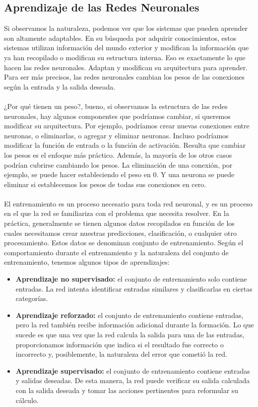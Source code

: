 \documentclass[12pt, a4paper, titlepage]{report}
\begin{document}
				\subsection{Aprendizaje de las Redes Neuronales}
				Si observamos la naturaleza, podemos ver que los sistemas que pueden aprender son altamente adaptables. En su búsqueda por adquirir conocimientos, estos sistemas utilizan información del mundo exterior y modifican la información que ya han recopilado o modifican su estructura interna. Eso es exactamente lo que hacen las redes neuronales. Adaptan y modifican su arquitectura para aprender. Para ser más precisos, las redes neuronales cambian los pesos de las conexiones según la entrada y la salida deseada.\\\\
				¿Por qué tienen un peso?, bueno, si observamos la estructura de las redes neuronales, hay algunos componentes que podríamos cambiar, si queremos modificar su arquitectura. Por ejemplo, podríamos crear nuevas conexiones entre neuronas, o eliminarlas, o agregar y eliminar neuronas. Incluso podríamos modificar la función de entrada o la función de activación. Resulta que cambiar los pesos es el enfoque más práctico. Además, la mayoría de los otros casos podrían cubrirse cambiando los pesos. La eliminación de una conexión, por ejemplo, se puede hacer estableciendo el peso en 0. Y una neurona se puede eliminar si establecemos los pesos de todas sus conexiones en cero.\cite{refAprendizajeRedes}\\\\
				El entrenamiento es un proceso necesario para toda red neuronal, y es un proceso en el que la red se familiariza con el problema que necesita resolver. En la práctica, generalmente se tienen algunos datos recopilados en función de los cuales necesitamos crear nuestras predicciones, clasificación, o cualquier otro procesamiento. Estos datos se denominan conjunto de entrenamiento. Según el comportamiento durante el entrenamiento y la naturaleza del conjunto de entrenamiento, tenemos algunos tipos de aprendizajes:\\
				\begin{itemize}
					\item \textbf{Aprendizaje no supervisado: }el conjunto de entrenamiento solo contiene entradas. La red intenta identificar entradas similares y clasificarlas en ciertas categorías.
					\item \textbf{Aprendizaje reforzado: }el conjunto de entrenamiento contiene entradas, pero la red también recibe información adicional durante la formación. Lo que sucede es que una vez que la red calcula la salida para una de las entradas, proporcionamos información que indica si el resultado fue correcto o incorrecto y, posiblemente, la naturaleza del error que cometió la red.
					\item \textbf{Aprendizaje supervisado: }el conjunto de entrenamiento contiene entradas y salidas deseadas. De esta manera, la red puede verificar su salida calculada con la salida deseada y tomar las acciones pertinentes para reformular su cálculo.
				\end{itemize}
\end{document}
